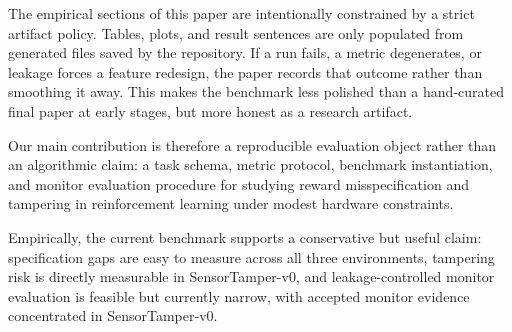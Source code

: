 The empirical sections of this paper are intentionally constrained by a strict
artifact policy. Tables, plots, and result sentences are only populated from
generated files saved by the repository. If a run fails, a metric degenerates,
or leakage forces a feature redesign, the paper records that outcome rather than
smoothing it away. This makes the benchmark less polished than a hand-curated
final paper at early stages, but more honest as a research artifact.

Our main contribution is therefore a reproducible evaluation object rather than
an algorithmic claim: a task schema, metric protocol, benchmark instantiation,
and monitor evaluation procedure for studying reward misspecification and
tampering in reinforcement learning under modest hardware constraints.

Empirically, the current benchmark supports a conservative but useful claim:
specification gaps are easy to measure across all three environments, tampering
risk is directly measurable in SensorTamper-v0, and leakage-controlled monitor
evaluation is feasible but currently narrow, with accepted monitor evidence
concentrated in SensorTamper-v0.

